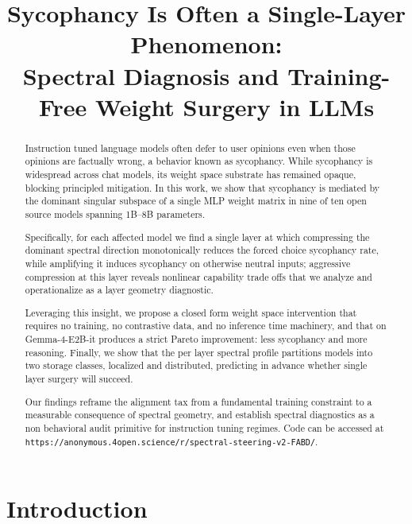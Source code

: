 \documentclass{article}
\title{\textbf{Sycophancy Is Often a Single-Layer Phenomenon:\\
 Spectral Diagnosis and Training-Free Weight Surgery in LLMs}}
\author{}
\date{}
\begin{document}
\maketitle

\begin{abstract}
Instruction tuned language models often defer to user opinions even when those opinions are factually wrong, a behavior known as sycophancy. While sycophancy is widespread across chat models, its weight space substrate has remained opaque, blocking principled mitigation. In this work, we show that sycophancy is mediated by the dominant singular subspace of a single MLP weight matrix in nine of ten open source models spanning 1B--8B parameters.

Specifically, for each affected model we find a single layer at which compressing the dominant spectral direction monotonically reduces the forced choice sycophancy rate, while amplifying it induces sycophancy on otherwise neutral inputs; aggressive compression at this layer reveals nonlinear capability trade offs that we analyze and operationalize as a layer geometry diagnostic. 

Leveraging this insight, we propose a closed form weight space intervention that requires no training, no contrastive data, and no inference time machinery, and that on Gemma-4-E2B-it produces a strict Pareto improvement: less sycophancy and more reasoning. Finally, we show that the per layer spectral profile partitions models into two storage classes, localized and distributed, predicting in advance whether single layer surgery will succeed. 

Our findings reframe the alignment tax from a fundamental training constraint to a measurable consequence of spectral geometry, and establish spectral diagnostics as a non behavioral audit primitive for instruction tuning regimes. Code can be accessed at \texttt{https://anonymous.4open.science/r/spectral-steering-v2-FABD/}.
\end{abstract}

\section{Introduction}
\label{sec:intro}
\end{document}
